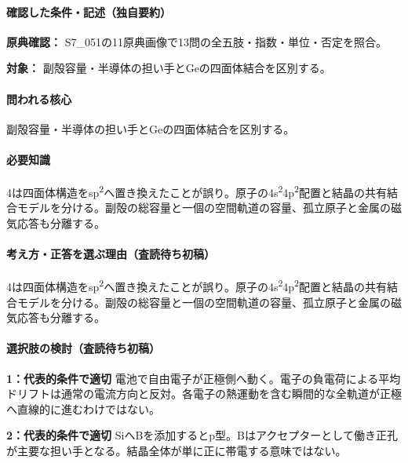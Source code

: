 \paragraph{確認した条件・記述（独自要約）}\mbox{}\par

\noindent\textbf{原典確認：} S7\_051の11原典画像で13問の全五肢・指数・単位・否定を照合。\par

\noindent\textbf{対象：} 副殻容量・半導体の担い手とGeの四面体結合を区別する。\par

\paragraph{問われる核心} 副殻容量・半導体の担い手とGeの四面体結合を区別する。

\paragraph{必要知識} 4は四面体構造をsp\textsuperscript{2}へ置き換えたことが誤り。原子の4s\textsuperscript{2}4p\textsuperscript{2}配置と結晶の共有結合モデルを分ける。副殻の総容量と一個の空間軌道の容量、孤立原子と金属の磁気応答も分離する。

\paragraph{考え方・正答を選ぶ理由（査読待ち初稿）} 4は四面体構造をsp\textsuperscript{2}へ置き換えたことが誤り。原子の4s\textsuperscript{2}4p\textsuperscript{2}配置と結晶の共有結合モデルを分ける。副殻の総容量と一個の空間軌道の容量、孤立原子と金属の磁気応答も分離する。

\paragraph{選択肢の検討（査読待ち初稿）}\mbox{}\par

\noindent\textbf{1：代表的条件で適切} 電池で自由電子が正極側へ動く。電子の負電荷による平均ドリフトは通常の電流方向と反対。各電子の熱運動を含む瞬間的な全軌道が正極へ直線的に進むわけではない。\par

\noindent\textbf{2：代表的条件で適切} SiへBを添加するとp型。Bはアクセプターとして働き正孔が主要な担い手となる。結晶全体が単に正に帯電する意味ではない。\par

